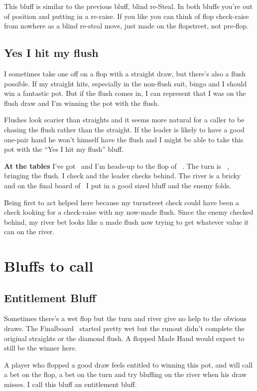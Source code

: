 This bluff is similar to the previous bluff, blind re-Steal. In both
bluffs you're out of position and putting in a re-raise. If you like
you can think of flop check-raise from nowhere as a blind re-steal
move, just made on the flopstreet, not pre-flop.

\subsection{Yes I hit my flush}

I sometimes take one off on a flop with a straight draw, but there's
also a flush possible. If my straight hits, especially in the
non-flush suit, bingo and I should win a fantastic pot. But if the
flush comes in, I can represent that I was on the flush draw and I'm
winning the pot with the flush.

Flushes look scarier than straights and it seems more natural for a
caller to be chasing the flush rather than the straight. If the leader
is likely to have a good one-pair hand he won't himself have the flush
and I might be able to take this pot with the ``Yes I hit my flush''
bluff.

\textbf{At the tables} I've got \nineh\eigc\ and I'm heads-up to the
flop of \Ad\tend\sevc\ . The turn is \tred\ , bringing the flush. I
check and the leader checks behind. The river is a bricky \Qc\, and on
the final board of \Ad\tend\sevc\tred\Qc\ I put in a good sized
bluff and the enemy folds.

Being first to act helped here because my turnstreet check could have
been a check looking for a check-raise with my now-made flush. Since
the enemy checked behind, my river bet looks like a made flush now
trying to get whatever value it can on the river.


\section{Bluffs to call}
\subsection{Entitlement Bluff}

Sometimes there's a wet flop but the turn and river give no help
to the obvious draws. The Finalboard \Jd\tend\fivec\twoh\sixs\ started
pretty wet but the runout didn't complete the original straights or the
diamond flush. A flopped Made Hand would expect to still be the winner
here.

A player who flopped a good draw feels entitled to winning
this pot, and will call a bet on the flop, a bet on the turn
and try bluffing on the river when his draw misses. I call
this bluff an entitlement bluff.

